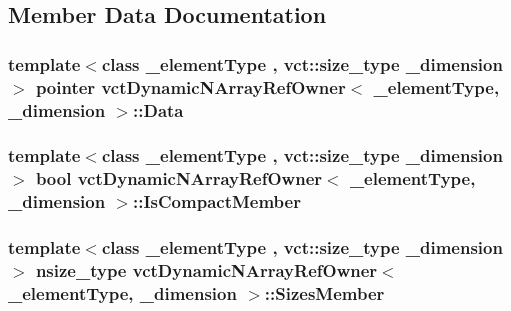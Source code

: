 \subsection{Member Data Documentation}
\hypertarget{classvct_dynamic_n_array_ref_owner_a11dcdd9e556492e0c6ef418b18723a04}{
\subsubsection[{Data}]{\setlength{\rightskip}{0pt plus 5cm}template$<$class \-\_\-element\-Type , vct\-::size\-\_\-type \-\_\-dimension$>$ pointer {\bf vct\-Dynamic\-N\-Array\-Ref\-Owner}$<$ \-\_\-element\-Type, \-\_\-dimension $>$\-::Data\hspace{0.3cm}{\ttfamily [protected]}}}\label{classvct_dynamic_n_array_ref_owner_a11dcdd9e556492e0c6ef418b18723a04}
\hypertarget{classvct_dynamic_n_array_ref_owner_ab650c2c3e47f0cf87e973e35a04d9175}{
\subsubsection[{Is\-Compact\-Member}]{\setlength{\rightskip}{0pt plus 5cm}template$<$class \-\_\-element\-Type , vct\-::size\-\_\-type \-\_\-dimension$>$ bool {\bf vct\-Dynamic\-N\-Array\-Ref\-Owner}$<$ \-\_\-element\-Type, \-\_\-dimension $>$\-::Is\-Compact\-Member\hspace{0.3cm}{\ttfamily [protected]}}}\label{classvct_dynamic_n_array_ref_owner_ab650c2c3e47f0cf87e973e35a04d9175}
\hypertarget{classvct_dynamic_n_array_ref_owner_af231e48b1bbeb0320c3e6cffffa1dc20}{
\subsubsection[{Sizes\-Member}]{\setlength{\rightskip}{0pt plus 5cm}template$<$class \-\_\-element\-Type , vct\-::size\-\_\-type \-\_\-dimension$>$ nsize\-\_\-type {\bf vct\-Dynamic\-N\-Array\-Ref\-Owner}$<$ \-\_\-element\-Type, \-\_\-dimension $>$\-::Sizes\-Member\hspace{0.3cm}{\ttfamily [protected]}}}\label{classvct_dynamic_n_array_ref_owner_af231e48b1bbeb0320c3e6cffffa1dc20}
